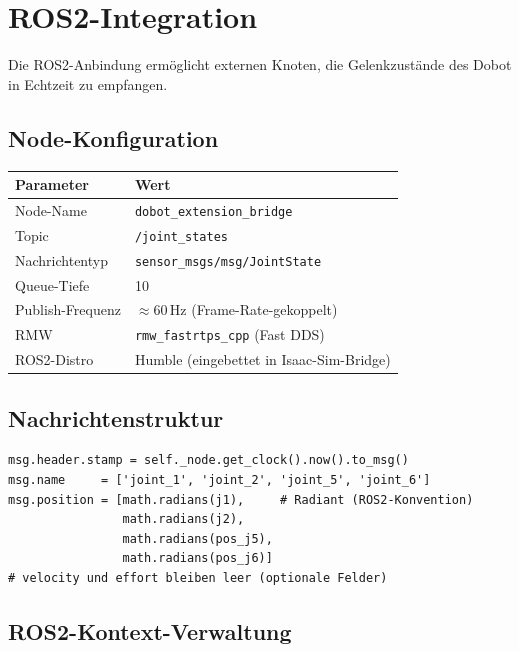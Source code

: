 \documentclass[11pt,a4paper]{article}
\begin{document}
\section{ROS2-Integration}
\label{sec:ros2}

Die ROS2-Anbindung ermöglicht externen Knoten, die Gelenkzustände
des Dobot in Echtzeit zu empfangen.

\subsection{Node-Konfiguration}

\begin{center}
\begin{tabular}{ll}
  \toprule
  Parameter & Wert \\
  \midrule
  Node-Name & \texttt{dobot\_extension\_bridge} \\
  Topic & \texttt{/joint\_states} \\
  Nachrichtentyp & \texttt{sensor\_msgs/msg/JointState} \\
  Queue-Tiefe & 10 \\
  Publish-Frequenz & $\approx 60$\,Hz (Frame-Rate-gekoppelt) \\
  RMW & \texttt{rmw\_fastrtps\_cpp} (Fast DDS) \\
  ROS2-Distro & Humble (eingebettet in Isaac-Sim-Bridge) \\
  \bottomrule
\end{tabular}
\end{center}

\subsection{Nachrichtenstruktur}

\begin{lstlisting}[caption={JointState-Nachricht in update\_step()}]
msg.header.stamp = self._node.get_clock().now().to_msg()
msg.name     = ['joint_1', 'joint_2', 'joint_5', 'joint_6']
msg.position = [math.radians(j1),     # Radiant (ROS2-Konvention)
                math.radians(j2),
                math.radians(pos_j5),
                math.radians(pos_j6)]
# velocity und effort bleiben leer (optionale Felder)
\end{lstlisting}

\subsection{ROS2-Kontext-Verwaltung}
\end{document}

